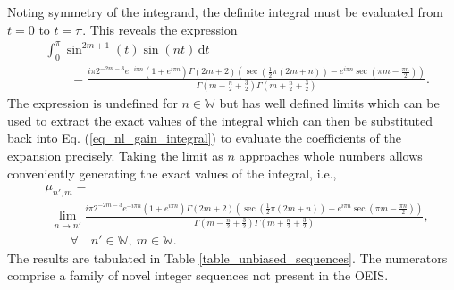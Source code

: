 Noting symmetry of the integrand, the definite integral must be evaluated
from $t = 0$ to $t = \pi$. This reveals the expression
\begin{align}
	&\int_{0}^{\pi} \sin^{2m+1}(t) \sin(nt) \, \mathrm{d}t \nonumber\\
	&\quad\quad = \frac{i \pi  2^{-2 m-3} e^{-i \pi  n} \left(1+e^{i \pi  n}\right) \Gamma (2 m+2) \left(\sec \left(\frac{1}{2} \pi  (2 m+n)\right)-e^{i \pi  n} \sec \left(\pi  m-\frac{\pi  n}{2}\right)\right)}{\Gamma \left(m-\frac{n}{2}+\frac{3}{2}\right) \Gamma \left(m+\frac{n}{2}+\frac{3}{2}\right)}.
\end{align}
The expression is undefined for $n \in \mathbb{W}$ but has well defined limits
which can be used to extract the exact values of the integral which can then
be substituted back into Eq. (\ref{eq_nl_gain_integral})
to evaluate the coefficients of the expansion precisely.
Taking the limit as $n$ approaches whole numbers allows conveniently generating
the exact values of the integral, i.e.,
\begin{align}
	&\mu_{n', m} =\nonumber\\
	&\ \ \lim_{n \to n'}
	\frac{i \pi  2^{-2 m-3} e^{-i \pi  n} \left(1+e^{i \pi  n}\right) \Gamma (2 m+2) \left(\sec \left(\frac{1}{2} \pi  (2 m+n)\right)-e^{i \pi  n} \sec \left(\pi  m-\frac{\pi  n}{2}\right)\right)}{\Gamma \left(m-\frac{n}{2}+\frac{3}{2}\right) \Gamma \left(m+\frac{n}{2}+\frac{3}{2}\right)}, \\
	&\quad\quad\forall\quad n' \in \mathbb{W},\ m \in \mathbb{W}. \nonumber
\end{align}
The results are tabulated in Table \ref{table_unbiased_sequences}.  The numerators comprise a family
of novel integer sequences not present in the OEIS.


